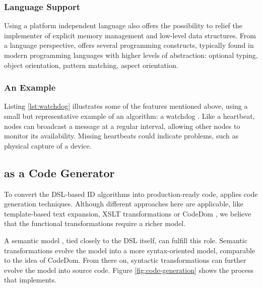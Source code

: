 \documentclass[conference]{IEEEtran}
\begin{document}
\subsubsection{Language Support}
\label{language-support}

Using a platform independent language also offers the possibility to relief the
implementer of explicit memory management and low-level data structures. From a
language perspective, \NAME offers several programming constructs, typically
found in modern programming languages with higher levels of abstraction:
optional typing, object orientation, pattern matching, aspect orientation.

\subsubsection{An Example}

Listing \ref{lst:watchdog} illustrates some of the features mentioned above,
using a small but representative example of an algorithm: a watchdog
\cite{mishra2004intrusion}. Like a heartbeat, nodes can broadcast a message at
a regular interval, allowing other nodes to monitor its availability. Missing
heartbeats could indicate problems, such as physical capture of a device.



\subsection{\NAME as a Code Generator}
\label{code-generator-design}

To convert the DSL-based ID algorithms into production-ready code, \NAME
applies code generation techniques. Although different approaches here are
applicable, like template-based text expansion, XSLT transformations or CodeDom
\cite{dollard2004code}, we believe that the functional transformations require
a richer model.

A semantic model \cite{fowler2010domain}, tied closely to the DSL itself, can
fulfill this role. Semantic transformations evolve the model into a more
syntax-oriented model, comparable to the idea of CodeDom. From there on,
syntactic transformations can further evolve the model into source code. Figure
\ref{fig:code-generation} shows the process that \NAME implements.
\end{document}
